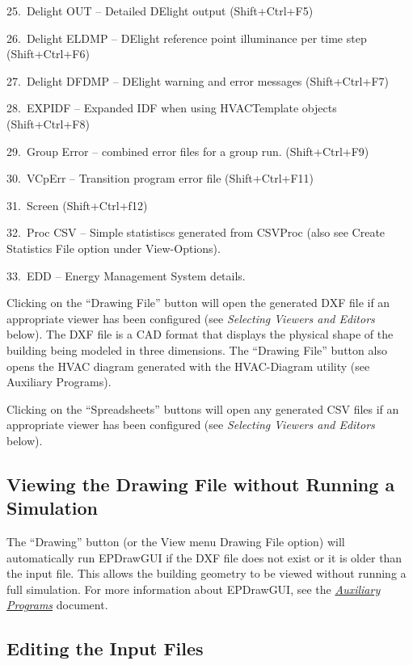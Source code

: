 25.~Delight OUT -- Detailed DElight output (Shift+Ctrl+F5)

26.~Delight ELDMP -- DElight reference point illuminance per time step (Shift+Ctrl+F6)

27.~Delight DFDMP -- DElight warning and error messages (Shift+Ctrl+F7)

28.~EXPIDF -- Expanded IDF when using HVACTemplate objects (Shift+Ctrl+F8)

29.~Group Error -- combined error files for a group run. (Shift+Ctrl+F9)

30.~VCpErr -- Transition program error file (Shift+Ctrl+F11)

31.~Screen (Shift+Ctrl+f12)

32.~Proc CSV -- Simple statistiscs generated from CSVProc (also see Create Statistics File option under View-Options).

33.~EDD -- Energy Management System details.

Clicking on the ``Drawing File'' button will open the generated DXF file if an appropriate viewer has been configured (see \emph{Selecting Viewers and Editors} below). The DXF file is a CAD format that displays the physical shape of the building being modeled in three dimensions. The ``Drawing File'' button also opens the HVAC diagram generated with the HVAC-Diagram utility (see Auxiliary Programs).

Clicking on the ``Spreadsheets'' buttons will open any generated CSV files if an appropriate viewer has been configured (see \emph{Selecting Viewers and Editors} below).

\subsection{Viewing the Drawing File without Running a Simulation}\label{viewing-the-drawing-file-without-running-a-simulation}

The ``Drawing'' button (or the View menu Drawing File option) will automatically run EPDrawGUI if the DXF file does not exist or it is older than the input file. This allows the building geometry to be viewed without running a full simulation. For more information about EPDrawGUI, see the \href{file:///E:/Docs4PDFs/AuxiliaryPrograms.pdf}{\emph{Auxiliary Programs}} document.

\subsection{Editing the Input Files}\label{editing-the-input-files}

